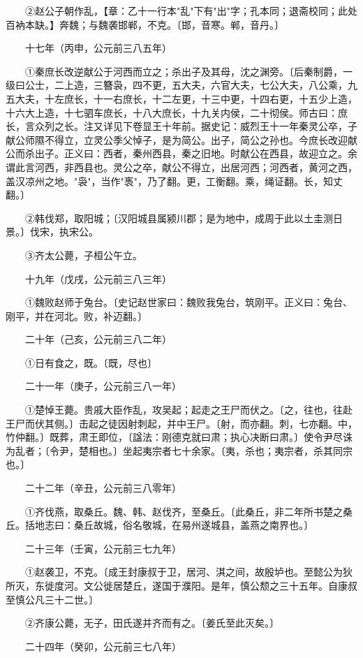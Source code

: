 　　②赵公子朝作乱，【章：乙十一行本"乱"下有"出"字；孔本同；退斋校同；此处百衲本缺。】奔魏；与魏袭邯郸，不克。〔邯，音寒。郸，音丹。〕

　　十七年（丙申，公元前三八五年）

　　①秦庶长改逆献公于河西而立之；杀出子及其母，沈之渊旁。〔后秦制爵，一级曰公士，二上造，三簪袅，四不更，五大夫，六官大夫，七公大夫，八公乘，九五大夫，十左庶长，十一右庶长，十二左更，十三中更，十四右更，十五少上造，十六大上造，十七驷车庶长，十八大庶长，十九关内侯，二十彻侯。师古曰：庶长，言众列之长。注又详见下卷显王十年前。据史记：威烈王十一年秦灵公卒，子献公师隰不得立，立灵公季父悼子，是为简公。出子，简公之孙也。今庶长改迎献公而杀出子。正义曰：西者，秦州西县，秦之旧地。时献公在西县，故迎立之。余谓此言河西，非西县也。灵公之卒，献公不得立，出居河西；河西者，黄河之西，盖汉凉州之地。"袅"，当作"褭"，乃了翻。更，工衡翻。乘，绳证翻。长，知丈翻。〕

　　②韩伐郑，取阳城；〔汉阳城县属颍川郡；是为地中，成周于此以土圭测日景。〕伐宋，执宋公。

　　③齐太公薨，子桓公午立。

　　十九年（戊戌，公元前三八三年）

　　①魏败赵师于兔台。〔史记赵世家曰：魏败我兔台，筑刚平。正义曰：兔台、刚平，并在河北。败，补迈翻。〕

　　二十年（己亥，公元前三八二年）

　　①日有食之，既。〔既，尽也〕

　　二十一年（庚子，公元前三八一年）

　　①楚悼王薨。贵戚大臣作乱，攻吴起；起走之王尸而伏之。〔之，往也，往赴王尸而伏其侧。〕击起之徒因射刺起，并中王尸。〔射，而亦翻。刺，七亦翻。中，竹仲翻。〕既葬，肃王即位，〔諡法：刚德克就曰肃；执心决断曰肃。〕使令尹尽诛为乱者；〔令尹，楚相也。〕坐起夷宗者七十余家。〔夷，杀也；夷宗者，杀其同宗也。〕

　　二十二年（辛丑，公元前三八零年）

　　①齐伐燕，取桑丘。魏、韩、赵伐齐，至桑丘。〔此桑丘，非二年所书楚之桑丘。括地志曰：桑丘故城，俗名敬城，在易州遂城县，盖燕之南界也。〕

　　二十三年（壬寅，公元前三七九年）

　　①赵袭卫，不克。〔成王封康叔于卫，居河、淇之间，故殷垆也。至懿公为狄所灭，东徙度河。文公徙居楚丘，遂国于濮阳。是年，慎公颓之三十五年。自康叔至慎公凡三十二世。〕

　　②齐康公薨，无子，田氏遂并齐而有之。〔姜氏至此灭矣。〕

　　二十四年（癸卯，公元前三七八年）

